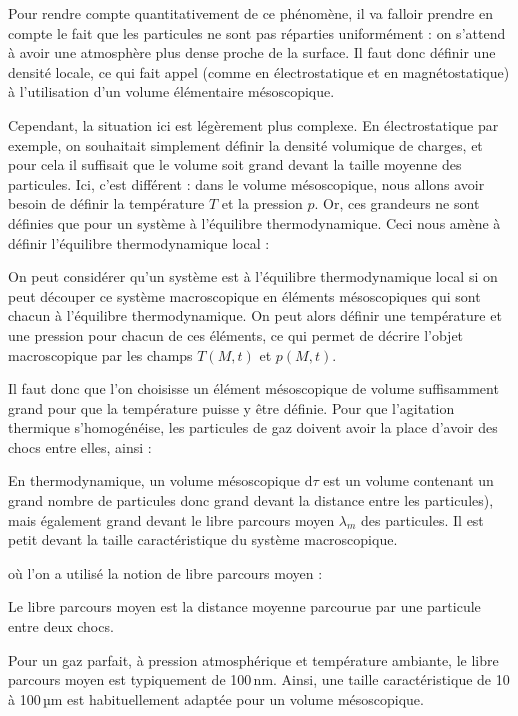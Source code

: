 \documentclass[11pt,fleqn]{book} %
\newcommand{\dd}{\mathrm{d}}
\begin{document}
Pour rendre compte quantitativement de ce phénomène, il va falloir prendre en compte le fait que les particules ne sont pas réparties uniformément : on s'attend à avoir une atmosphère plus dense proche de la surface. Il faut donc définir une densité locale, ce qui fait appel (comme en électrostatique et en magnétostatique) à l'utilisation d'un volume élémentaire mésoscopique.

Cependant, la situation ici est légèrement plus complexe. En électrostatique par exemple, on souhaitait simplement définir la densité volumique de charges, et pour cela il suffisait que le volume soit grand devant la taille moyenne des particules. Ici, c'est différent : dans le volume mésoscopique, nous allons avoir besoin de définir la température $T$ et la pression $p$. Or, ces grandeurs ne sont définies que pour un système à l'équilibre thermodynamique. Ceci nous amène à définir l'équilibre thermodynamique local :
\begin{definition}
	On peut considérer qu'un système est à l'équilibre thermodynamique local si on peut découper ce système macroscopique en éléments mésoscopiques qui sont chacun à l'équilibre thermodynamique.
	On peut alors définir une température et une pression pour chacun de ces éléments, ce qui permet de décrire l'objet macroscopique par les champs $T(M,t)$ et $p(M,t)$.
\end{definition}

Il faut donc que l'on choisisse un élément mésoscopique de volume suffisamment grand pour que la température puisse y être définie. Pour que l'agitation thermique s'homogénéise, les particules de gaz doivent avoir la place d'avoir des chocs entre elles, ainsi :
\begin{definition}
	En thermodynamique, un volume mésoscopique $\dd \tau$ est un volume contenant un grand nombre de particules donc grand devant la distance entre les particules), mais également grand devant le libre parcours moyen $\lambda_m$ des particules. Il est petit devant la taille caractéristique du système macroscopique.
\end{definition}
où l'on a utilisé la notion de libre parcours moyen :
\begin{definition}
	Le libre parcours moyen est la distance moyenne parcourue par une particule entre deux chocs.
\end{definition}

Pour un gaz parfait, à pression atmosphérique et température ambiante, le libre parcours moyen est typiquement de 100\,nm. Ainsi, une taille caractéristique de 10 à 100\,µm est habituellement adaptée pour un volume mésoscopique.
\end{document}
